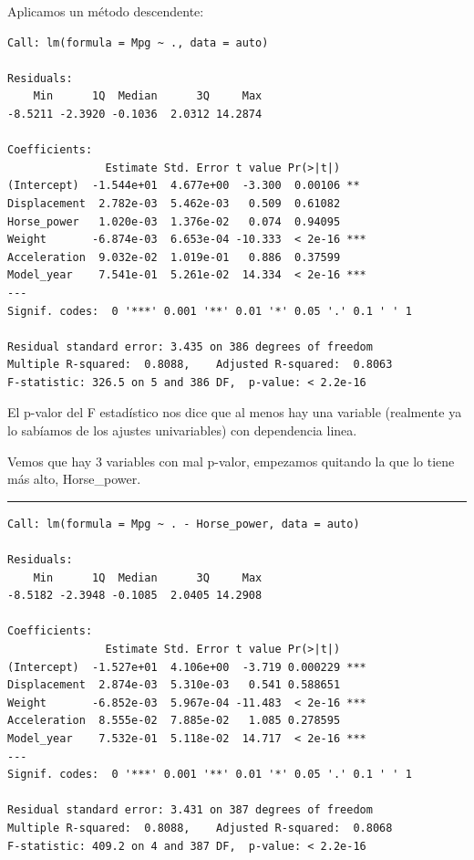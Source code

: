 Aplicamos un método descendente:

\begin{verbatim}
Call: lm(formula = Mpg ~ ., data = auto)

Residuals:
    Min      1Q  Median      3Q     Max 
-8.5211 -2.3920 -0.1036  2.0312 14.2874 

Coefficients:
               Estimate Std. Error t value Pr(>|t|)    
(Intercept)  -1.544e+01  4.677e+00  -3.300  0.00106 ** 
Displacement  2.782e-03  5.462e-03   0.509  0.61082    
Horse_power   1.020e-03  1.376e-02   0.074  0.94095    
Weight       -6.874e-03  6.653e-04 -10.333  < 2e-16 ***
Acceleration  9.032e-02  1.019e-01   0.886  0.37599    
Model_year    7.541e-01  5.261e-02  14.334  < 2e-16 ***
---
Signif. codes:  0 '***' 0.001 '**' 0.01 '*' 0.05 '.' 0.1 ' ' 1

Residual standard error: 3.435 on 386 degrees of freedom
Multiple R-squared:  0.8088,    Adjusted R-squared:  0.8063 
F-statistic: 326.5 on 5 and 386 DF,  p-value: < 2.2e-16
\end{verbatim}


El p-valor del F estadístico nos dice que al menos hay una variable (realmente ya lo sabíamos de los ajustes univariables) con dependencia linea.

\vspace{\baselineskip}

Vemos que hay 3 variables con mal p-valor, empezamos quitando la que lo tiene más alto, Horse\_power.

\begin{center}\rule{\linewidth}{0.5pt}\end{center}

\begin{verbatim}
Call: lm(formula = Mpg ~ . - Horse_power, data = auto)

Residuals:
    Min      1Q  Median      3Q     Max 
-8.5182 -2.3948 -0.1085  2.0405 14.2908 

Coefficients:
               Estimate Std. Error t value Pr(>|t|)    
(Intercept)  -1.527e+01  4.106e+00  -3.719 0.000229 ***
Displacement  2.874e-03  5.310e-03   0.541 0.588651    
Weight       -6.852e-03  5.967e-04 -11.483  < 2e-16 ***
Acceleration  8.555e-02  7.885e-02   1.085 0.278595    
Model_year    7.532e-01  5.118e-02  14.717  < 2e-16 ***
---
Signif. codes:  0 '***' 0.001 '**' 0.01 '*' 0.05 '.' 0.1 ' ' 1

Residual standard error: 3.431 on 387 degrees of freedom
Multiple R-squared:  0.8088,    Adjusted R-squared:  0.8068 
F-statistic: 409.2 on 4 and 387 DF,  p-value: < 2.2e-16
\end{verbatim}

